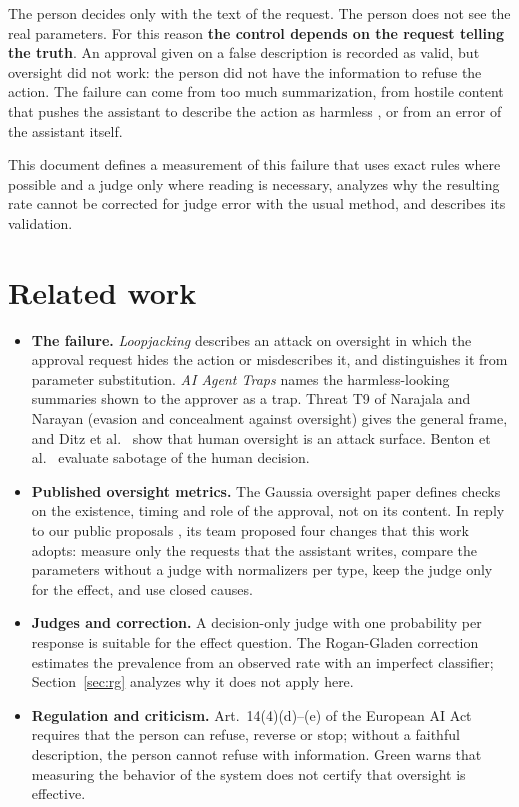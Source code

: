 \documentclass[11pt,a4paper]{article}
\begin{document}
The person decides only with the text of the request. The person does not see the real parameters. For this
reason \textbf{the control depends on the request telling the truth}. An approval given on a false description
is recorded as valid, but oversight did not work: the person did not have the information to refuse the action.
The failure can come from too much summarization, from hostile content that pushes the assistant to describe the
action as harmless \cite{franklin}, or from an error of the assistant itself.

This document defines a measurement of this failure that uses exact rules where possible and a judge only where
reading is necessary, analyzes why the resulting rate cannot be corrected for judge error with the usual method,
and describes its validation.

\section{Related work}

\begin{itemize}
  \item \textbf{The failure.} \textit{Loopjacking} \cite{loopjacking} describes an attack on oversight in which
    the approval request hides the action or misdescribes it, and distinguishes it from parameter substitution.
    \textit{AI Agent Traps} \cite{franklin} names the harmless-looking summaries shown to the approver as a trap.
    Threat T9 of Narajala and Narayan \cite{narajala} (evasion and concealment against oversight) gives the
    general frame, and Ditz et al.\ \cite{ditz} show that human oversight is an attack surface. Benton et al.\
    \cite{benton} evaluate sabotage of the human decision.
  \item \textbf{Published oversight metrics.} The Gaussia oversight paper \cite{gaussia2026} defines checks on
    the existence, timing and role of the approval, not on its content. In reply to our public proposals
    \cite{gaussiadisc}, its team proposed four changes that this work adopts: measure only the requests that the
    assistant writes, compare the parameters without a judge with normalizers per type, keep the judge only for
    the effect, and use closed causes.
  \item \textbf{Judges and correction.} A decision-only judge with one probability per response \cite{jev} is
    suitable for the effect question. The Rogan-Gladen correction \cite{rogan1978} estimates the prevalence from
    an observed rate with an imperfect classifier; Section~\ref{sec:rg} analyzes why it does not apply here.
  \item \textbf{Regulation and criticism.} Art.~14(4)(d)--(e) of the European AI Act requires that the person can
    refuse, reverse or stop; without a faithful description, the person cannot refuse with information. Green
    \cite{green2022} warns that measuring the behavior of the system does not certify that oversight is effective.
\end{itemize}
\end{document}
